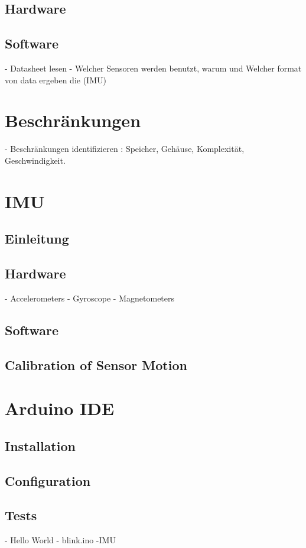 \subsection{Hardware}
	\subsection{Software}
	- Datasheet lesen
	- Welcher Sensoren werden benutzt, warum und Welcher format von data ergeben die (IMU) 
	\section{Beschränkungen}
	- Beschränkungen identifizieren : Speicher, Gehäuse, Komplexität, Geschwindigkeit.   
	\section{IMU}
	\subsection{Einleitung}
	\subsection{Hardware}
	- Accelerometers
	- Gyroscope
	- Magnetometers
	\subsection{Software}
	\subsection{Calibration of Sensor Motion}
	\section{Arduino IDE}
	\subsection{Installation}
	\subsection{Configuration}
	\subsection{Tests}
	- Hello World - blink.ino
	-IMU
